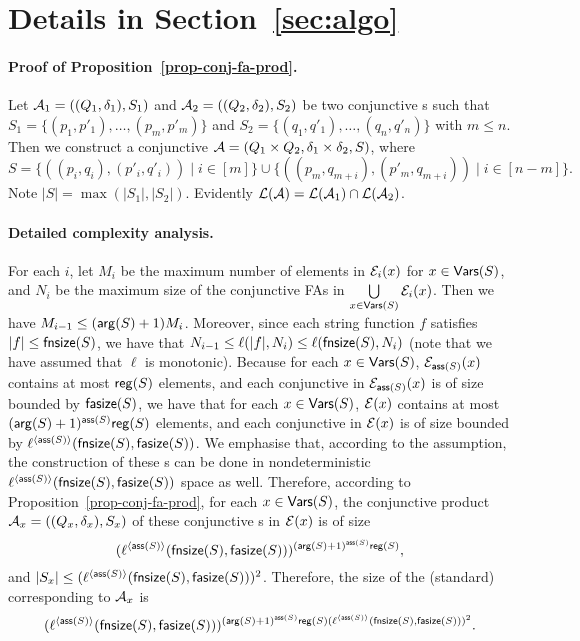 
\section{Details in Section~\ref{sec:algo}}

\paragraph{Proof of Proposition~\ref{prop-conj-fa-prod}.}
Let $\mathcal{A}_1 = ((Q_1, \delta_1), S_1)$ and $\mathcal{A}_2 = ((Q_2, \delta_2), S_2)$ be two conjunctive \FA{}s such that $S_1 = \{(p_1, p'_1),\ldots, (p_m, p'_m)\}$ and $S_2 = \{(q_1, q'_1), \ldots, (q_n, q'_n)\}$ with $m \le n$. Then we construct a conjunctive \FA{} $\mathcal{A} = (Q_1 \times Q_2, \delta_1 \times \delta_2, S)$, where 
$$S= \{((p_i, q_i), (p'_i, q'_i)) \mid i \in [m]\} \cup \{((p_m, q_{m+i}), (p'_m, q_{m+i})) \mid i \in [n-m]\}.$$ 
Note $|S|  = \max(|S_1|, |S_2|)$. Evidently $\mathcal{L}(\mathcal{A}) = \mathcal{L}(\mathcal{A}_1) \cap \mathcal{L}(\mathcal{A}_2)$. 



\paragraph{Detailed complexity analysis.}
For each $i$, 
let $M_i$ be the maximum number of elements in $\mathcal{E}_i(x)$ for $x  \in \mathsf{Vars}(S)$,
and $N_i$ be the maximum size of the conjunctive FAs in $\bigcup \limits_{x \in \mathsf{Vars}(S)} \mathcal{E}_i(x)$.
Then we have $M_{i-1} \le (\mathsf{arg}(S)+1)M_i $. Moreover, since each string function $f$ satisfies   $|f| \le \mathsf{fnsize}(S)$, we have that $N_{i-1} \le \ell(|f|, N_i) \le \ell(\mathsf{fnsize}(S), N_i)$ (note that we have assumed that $\ell$ is monotonic). Because for each $x \in \mathsf{Vars}(S)$, $\mathcal{E}_{\mathsf{ass}(S)}(x)$ contains at most $\mathsf{reg}(S)$ elements, and 
each conjunctive \FA{} in $\mathcal{E}_{\mathsf{ass}(S)}(x)$ is of size bounded by $\mathsf{fasize}(S)$, we have that for each $x \in \mathsf{Vars}(S)$, $\mathcal{E}(x)$ contains at most $(\mathsf{arg}(S)+1)^{\mathsf{ass}(S)}\mathsf{reg}(S)$ elements, and each conjunctive \FA{} in $\mathcal{E}(x)$ is of size bounded by $\ell^{\langle \mathsf{ass}(S) \rangle}(\mathsf{fnsize}(S), \mathsf{fasize}(S))$. 
We emphasise that, according to the \prerec{} assumption, the construction of these \FA{}s can be done in nondeterministic $\ell^{\langle \mathsf{ass}(S) \rangle}(\mathsf{fnsize}(S), \mathsf{fasize}(S))$ space as well. 
Therefore, according to Proposition~\ref{prop-conj-fa-prod}, for each $x \in \mathsf{Vars}(S)$, the conjunctive product \FA{} $\mathcal{A}_x=((Q_x, \delta_x), S_x)$ of these conjunctive \FA{}s  in $\mathcal{E}(x)$ is of size 
$$(\ell^{\langle \mathsf{ass}(S) \rangle}(\mathsf{fnsize}(S), \mathsf{fasize}(S)))^{(\mathsf{arg}(S)+1)^{\mathsf{ass}(S)} \mathsf{reg}(S)},$$
and $|S_x| \le (\ell^{\langle \mathsf{ass}(S) \rangle}(\mathsf{fnsize}(S), \mathsf{fasize}(S)))^2$. Therefore, the size of the (standard) \FA{} corresponding to $\mathcal{A}_x$ is 
$$(\ell^{\langle \mathsf{ass}(S) \rangle}(\mathsf{fnsize}(S), \mathsf{fasize}(S)))^{(\mathsf{arg}(S)+1)^{\mathsf{ass}(S)} \mathsf{reg}(S) (\ell^{\langle \mathsf{ass}(S) \rangle}(\mathsf{fnsize}(S), \mathsf{fasize}(S)))^2}.$$

